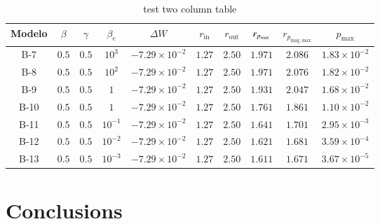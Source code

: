 \documentclass{aa}
\begin{document}
\begin{table}
\caption{test two column table}             
\label{table:1}      
\centering          
\begin{tabular}{c c c c c c c c c c}
\hline\hline       
                      
Modelo & $\beta$ & $\gamma$ & $\beta_{\mathrm{c}}$ & $\Delta W$ & $r_{\mathrm{in}}$ & $r_{\mathrm{out}}$ & $r_{p_{\rm{max}}}$ & $r_{p_{\mathrm{mag, max}}}$ & $p_{\mathrm{max}}$\\ 
\hline                    
  B-7 & $0.5$ & $0.5$ & $10^{3}$ & $-7.29 \times 10^{-2}$ & $1.27$ & $2.50$ & $1.971$ & $2.086$ & $1.83 \times 10^{-2}$\\ 
  B-8 & $0.5$ & $0.5$ & $10^{2}$ & $-7.29 \times 10^{-2}$ & $1.27$ & $2.50$ & $1.971$ & $2.076$ & $1.82 \times 10^{-2}$\\ 
  B-9 & $0.5$ & $0.5$ & $1$ & $-7.29 \times 10^{-2}$ & $1.27$ & $2.50$ & $1.931$ & $2.047$ & $1.68 \times 10^{-2}$\\ 
  B-10 & $0.5$ & $0.5$ & $1$ & $-7.29 \times 10^{-2}$ & $1.27$ & $2.50$ & $1.761$ & $1.861$ & $1.10 \times 10^{-2}$\\ 
  B-11 & $0.5$ & $0.5$ & $10^{-1}$ & $-7.29 \times 10^{-2}$ & $1.27$ & $2.50$ & $1.641$ & $1.701$ & $2.95 \times 10^{-3}$\\ 
  B-12 & $0.5$ & $0.5$ & $10^{-2}$ & $-7.29 \times 10^{-2}$ & $1.27$ & $2.50$ & $1.621$ & $1.681$ & $3.59 \times 10^{-4}$\\ 
  B-13 & $0.5$ & $0.5$ & $10^{-3}$ & $-7.29 \times 10^{-2}$ & $1.27$ & $2.50$ & $1.611$ & $1.671$ & $3.67 \times 10^{-5}$\\ 
\hline                  
\end{tabular}
\end{table}


\section{Conclusions}

%
\end{document}
